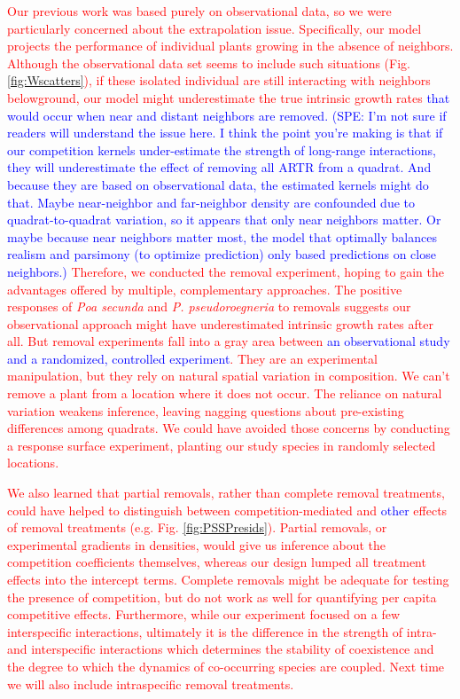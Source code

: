 \documentclass[11pt]{article}
\newcommand{\new}{\textcolor{red}}
\newcommand{\spe}{\textcolor{blue}}
\begin{document}
\begin{doublespacing}
\new{Our previous work was based purely on observational data, so we were particularly concerned about the extrapolation issue.
Specifically, our model projects the performance of individual plants growing in the absence of neighbors. Although the observational data set seems to include such situations (Fig. \ref{fig:Wscatters}), if these isolated individual are still interacting with neighbors belowground, our model might underestimate the true intrinsic growth rates \spe{that would occur when near and distant neighbors are removed.} 
\spe{(SPE: I'm not sure if readers will understand the issue here. I think the point you're making is that if our competition kernels
under-estimate the strength of long-range interactions, they will underestimate the effect of removing all ARTR from a quadrat. 
And because they are based on observational data, the estimated kernels might do that. Maybe near-neighbor and far-neighbor density 
are confounded due to quadrat-to-quadrat variation, so it appears that only near neighbors matter. Or maybe because 
near neighbors matter most, the model that optimally balances
realism and parsimony (to optimize prediction) only based predictions on close neighbors.)} 
Therefore, we conducted the removal experiment, hoping to gain the advantages offered by multiple, complementary approaches. The positive responses of \textit{Poa secunda} and \textit{P. pseudoroegneria} to removals suggests our observational approach might have underestimated intrinsic growth rates after all. But removal experiments fall into a gray area between \spe{an observational study and a randomized, controlled experiment}. They are an experimental manipulation, but they rely on natural spatial variation in composition. We can't remove a plant from a location where it does not occur. The reliance on natural variation weakens inference, leaving nagging questions about pre-existing differences among quadrats. We could have avoided those concerns by conducting a response surface experiment, planting our study species in randomly selected locations.}

\new{We also learned that partial removals, rather than complete removal treatments, could 
have helped to distinguish between competition-mediated and \spe{other} effects of removal treatments (e.g. Fig. \ref{fig:PSSPresids}).
Partial removals, or experimental gradients in densities, would give us inference about the competition coefficients themselves, whereas our 
design lumped all treatment effects into the intercept terms. Complete removals might be adequate for testing the presence of competition, but do not work as well for quantifying per capita competitive effects. 
Furthermore, while our experiment focused on a few interspecific interactions, ultimately it is the difference in the strength of intra- and interspecific interactions which determines the stability of coexistence and the degree to which the dynamics of co-occurring species are coupled. Next time we will also include intraspecific removal treatments. }


\end{doublespacing}
\end{document}
